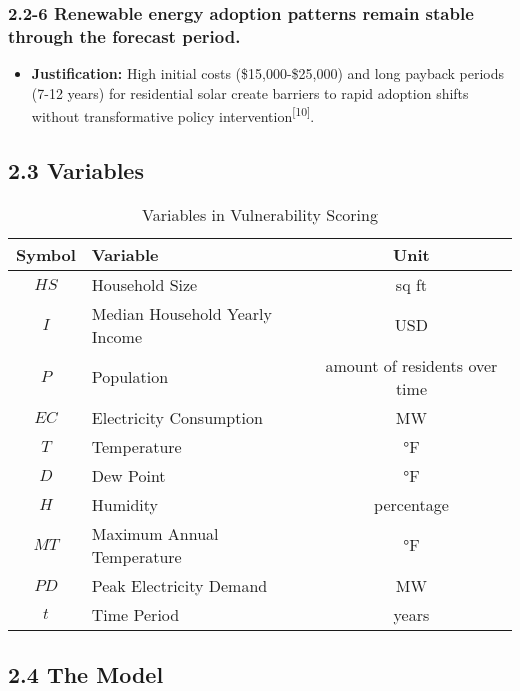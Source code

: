 \documentclass{article}
\begin{document}
\subsubsection*{2.2-6 Renewable energy adoption patterns remain stable through the forecast period.}
\begin{itemize}
    \item \textbf{Justification:} 
High initial costs (\$15,000-\$25,000) and long payback periods (7-12 years) for residential solar create barriers to rapid adoption shifts without transformative policy intervention\textsuperscript{[10]}.

\end{itemize}

\subsection*{2.3 Variables}
\begin{table}[h]
    \centering
    \begin{tabular}{|c|l|c|}
        \hline
        \textbf{Symbol} & \textbf{Variable} & \textbf{Unit} \\ 
        \hline
        $HS$ & Household Size  & sq ft \\ 
        \hline
        $I$ & Median Household Yearly Income & USD \\ 
        \hline
        $P$ & Population & amount of residents over time  \\ 
        \hline
        $EC$ & Electricity Consumption & MW \\ 
        \hline
        $T$ & Temperature & °F \\ 
       \hline
       $D$ & Dew Point & °F \\ 
       \hline
       $H$ & Humidity & percentage \\ 
       \hline
       $MT$ & Maximum Annual Temperature & °F \\ 
       \hline
       $PD$ & Peak Electricity Demand & MW \\ 
       \hline
       $t$ & Time Period & years \\ 
       \hline
    \end{tabular}
    \caption{Variables in Vulnerability Scoring}
    \label{tab:variables}
\end{table}
\subsection*{2.4 The Model}
\end{document}
